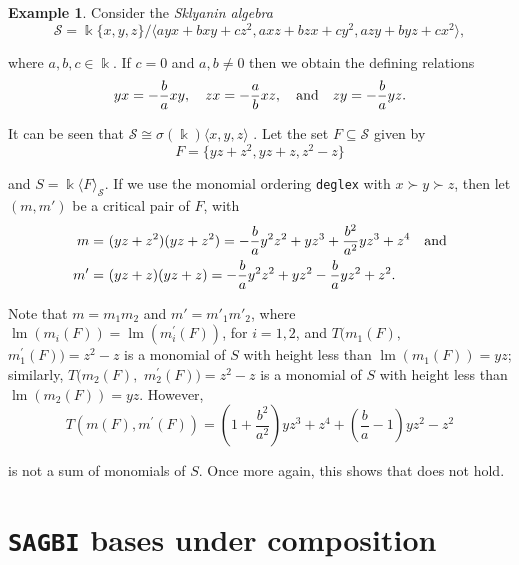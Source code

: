 \documentclass{amsart}
\theoremstyle{definition}
\newtheorem{example}[theorem]{Example}
\theoremstyle{remark}
\numberwithin{equation}{section}
\begin{document}
\begin{example}
Consider the {\em Sklyanin algebra} 
$$
\mathcal{S} = \Bbbk\{x, y, z\} /\langle ayx + bxy + cz^2, axz + bzx + cy^2, azy + byz + cx^2\rangle,
$$

where $a, b, c\in \Bbbk$. If $c=0$ and $a,b\neq 0$ then we obtain the defining relations 
$$
yx = -\displaystyle\frac{b}{a}xy, \quad zx = -\displaystyle\frac{a}{b}xz, \quad {\rm and} \quad zy = -\displaystyle\frac{b}{a}yz.
$$

It can be seen that $\mathcal{S}\cong\sigma(\Bbbk)\langle x,y,z\rangle$ \cite[Theorem 1.14]{ReyesSuarezMomento2017}. Let the set $F\subseteq \mathcal{S}$ given by
\[
F = \{yz+z^2, yz+z, z^2-z\}
\] 

and $S=\Bbbk\langle F\rangle_{\mathcal{S}}$. If we use the monomial ordering \texttt{deglex} with $x\succ y\succ z$, then let $(m, m')$ be a critical pair of $F$, with
\begin{align}
    m = &\ (yz+z^2)(yz+z^2)=-\displaystyle\frac{b}{a}y^2z^2+yz^3+\displaystyle\frac{b^2}{a^2}yz^3+z^4 \quad {\rm and} \\
    m' = &\ (yz+z)(yz+z)=-\displaystyle\frac{b}{a}y^2z^2+yz^2-\displaystyle\frac{b}{a}yz^2+z^2.
\end{align}

Note that $m = m_1m_2$ and $m' = m'_1m'_2$, where $\operatorname{lm}(m_{i}(F))=\operatorname{lm}(m_{i}^{\prime}(F))$, for $i = 1, 2$, and $T(m_{1}(F),$ $m_{1}^{\prime}(F))=z^2-z$ is a monomial of $S$ with height less than $\operatorname{lm}(m_1(F))=yz$; similarly, $T(m_{2}(F),$ $m_{2}^{\prime}(F))=z^2-z$ is a monomial of $S$ with height less than $\operatorname{lm}(m_2(F))=yz$. However, 
$$
T(m(F), m^{\prime}(F))=\left(1+\displaystyle\frac{b^2}{a^2}\right) yz^3+z^4+\left(\displaystyle\frac{b}{a}-1\right)yz^2-z^2
$$ 

is not a sum of monomials of $S$. Once more again, this shows that \cite[Proposition 6]{Nordbeck1998} does not hold.
\end{example}


\section{\texttt{SAGBI} bases under composition}\label{SPBWBasesundercomposition}
\end{document}
